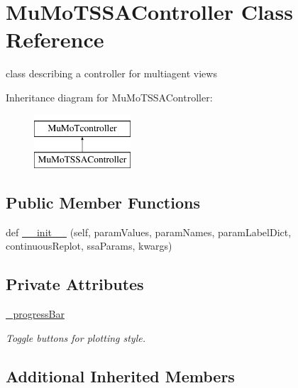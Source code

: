 \hypertarget{class_mu_mo_t_1_1_mu_mo_t_1_1_mu_mo_t_s_s_a_controller}{}\section{Mu\+Mo\+T\+S\+S\+A\+Controller Class Reference}
\label{class_mu_mo_t_1_1_mu_mo_t_1_1_mu_mo_t_s_s_a_controller}


class describing a controller for multiagent views  


Inheritance diagram for Mu\+Mo\+T\+S\+S\+A\+Controller\+:\begin{figure}[H]
\begin{center}
\leavevmode
\includegraphics[height=2.000000cm]{class_mu_mo_t_1_1_mu_mo_t_1_1_mu_mo_t_s_s_a_controller}
\end{center}
\end{figure}
\subsection*{Public Member Functions}
\begin{DoxyCompactItemize}
\item 
def \hyperlink{class_mu_mo_t_1_1_mu_mo_t_1_1_mu_mo_t_s_s_a_controller_aca0478525092b12bd60e9ee971100a57}{\+\_\+\+\_\+init\+\_\+\+\_\+} (self, param\+Values, param\+Names, param\+Label\+Dict, continuous\+Replot, ssa\+Params, kwargs)
\end{DoxyCompactItemize}
\subsection*{Private Attributes}
\begin{DoxyCompactItemize}
\item 
\hyperlink{class_mu_mo_t_1_1_mu_mo_t_1_1_mu_mo_t_s_s_a_controller_a018864aa22d2adb0d3958fb0adbce8e2}{\+\_\+progress\+Bar}
\begin{DoxyCompactList}\small\item\em Toggle buttons for plotting style. \end{DoxyCompactList}\end{DoxyCompactItemize}
\subsection*{Additional Inherited Members}


